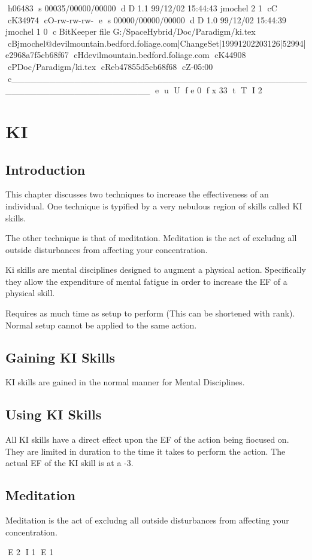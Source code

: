 h06483
s 00035/00000/00000
d D 1.1 99/12/02 15:44:43 jmochel 2 1
cC
cK34974
cO-rw-rw-rw-
e
s 00000/00000/00000
d D 1.0 99/12/02 15:44:39 jmochel 1 0
c BitKeeper file G:/SpaceHybrid/Doc/Paradigm/ki.tex
cBjmochel@devilmountain.bedford.foliage.com|ChangeSet|19991202203126|52994|e2968a7f5cb68f67
cHdevilmountain.bedford.foliage.com
cK44908
cPDoc/Paradigm/ki.tex
cReb47855d5cb68f68
cZ-05:00
c______________________________________________________________________
e
u
U
f e 0
f x 33
t
T
I 2
\chapter{KI}

\section{Introduction}

This chapter discusses two techniques to increase the effectiveness 
of an individual. One technique is typified by a  very nebulous 
region of skills called KI skills. 

The other technique is that of meditation. 
Meditation is the act of excludng all outside disturbances from 
affecting your concentration.  

Ki skills are mental disciplines designed
to augment a physical action. Specifically they allow the expenditure
of mental fatigue in order to increase the EF of a physical skill.  

Requires as much time as setup to perform (This can be shortened with rank).
Normal setup cannot be applied to the same action.

\section{Gaining KI Skills}

KI skills are gained in the normal manner for Mental Disciplines. 

\section{Using KI Skills}

All KI skills have a direct effect upon the EF of the action being 
fiocused on. They are limited in duration to the time it takes to 
perform the action. The actual EF of the KI skill is at a -3. 

\section{Meditation}

Meditation is the act of excludng all outside disturbances from 
affecting your concentration.  


E 2
I 1
E 1

